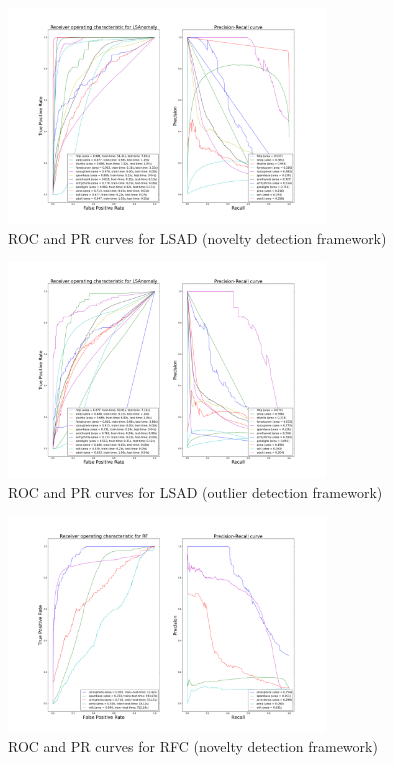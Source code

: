 \begin{figure}[!ht]
    \caption{\acs{ROC} and \acs{PR} curves for \acs{LSAD} (novelty detection
    framework)}
    \label{ocrf:fig:LSAnomaly_roc_pr}
    \centering
    \includegraphics[trim=175 80 175 123, clip,
    width=0.75\textwidth]{./gfx/bench_LSAnomaly_roc_pr_supervised_factorized.png}
\end{figure}
\begin{figure}[!ht]
    \caption{\acs{ROC} and \acs{PR} curves for \acs{LSAD} (outlier detection
    framework)}
    \label{ocrf:fig:LSAnomaly_roc_pr_unsupervised}
    \centering
    \includegraphics[trim=175 80 175 123, clip,
    width=0.75\textwidth]{./gfx/bench_LSAnomaly_roc_pr_unsupervised_factorized.png}
\end{figure}
\begin{figure}[!ht]
    \caption{\acs{ROC} and \acs{PR} curves for \acs{RFC} (novelty detection
    framework)}
    \label{ocrf:fig:rf_roc_pr}
    \centering
    \includegraphics[trim=175 80 175 123, clip,
    width=0.75\textwidth]{./gfx/bench_rf_roc_pr_supervised_factorized.png}
\end{figure}
